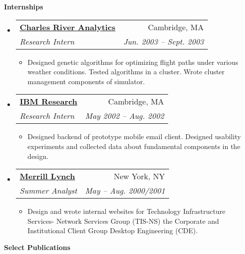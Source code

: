 \documentclass[letterpaper,11pt]{article}
\makeatletter
\newcommand{\resitem}[1]{\item #1 \vspace{-2pt}}
\newcommand{\resheading}[1]{{\large \colorbox{mygrey}{\begin{minipage}{\textwidth}{\textbf{#1 \vphantom{p\^{E}}}}\end{minipage}}}}
\newcommand{\ressubheading}[4]{
\begin{tabular*}{6.5in}{l@{\extracolsep{\fill}}r}
		\textbf{#1} & #2 \\
		\textit{#3} & \textit{#4} \\
\end{tabular*}\vspace{-6pt}}
\makeatother
\begin{document}
\resheading{Internships}
	\begin{itemize}

        \item 
			\ressubheading{\href{}{Charles River Analytics}}{Cambridge, MA}
				{Research Intern}{Jun. 2003 -- Sept. 2003}
				{ \footnotesize
				\begin{itemize}
                    \resitem{Designed genetic algorithms for optimizing flight paths under various weather conditions.  Tested algorithms in a cluster.  Wrote cluster management components of simulator.}
				\end{itemize}
				}


        \item 
			\ressubheading{\href{}{IBM Research}}{Cambridge, MA}
				{Research Intern}{May 2002 -- Aug. 2002}
				{ \footnotesize
				\begin{itemize}
                    \resitem{Designed backend of prototype mobile email client.  Designed usability experiments and collected data about fundamental components in the design.}
				\end{itemize}
				}

        \item 
			\ressubheading{\href{}{Merrill Lynch}}{New York, NY}
				{Summer Analyst}{May -- Aug. 2000/2001}
				{ \footnotesize
				\begin{itemize}
                    \resitem{Design and wrote internal websites for Technology Infrastructure Services- Network Services Group (TIS-NS) the Corporate and Institutional Client Group Desktop Engineering (CDE).}
				\end{itemize}
				}

	\end{itemize}  %




\resheading{Select Publications}
\nocite{*}                                          %
\printbibliography[heading=none]
\end{document}
